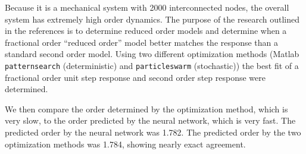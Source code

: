 Because it is a mechanical system with 2000 interconnected nodes, the overall
system has extremely high order dynamics. The purpose of the research outlined
in the references is to determine reduced order models and determine when a
fractional order ``reduced order'' model better matches the response than a
standard second order model. Using two different optimization methods (Matlab
\texttt{patternsearch} (deterministic) and \texttt{particleswarm} (stochastic))
the best fit of a fractional order unit step response and second order step
response were determined. 

We then compare the order determined by the optimization method, which is very
slow, to the order predicted by the neural network, which is very fast.  The
predicted order by the neural network was 1.782. The predicted order by the two
optimization methods was 1.784, showing nearly exact agreement.
